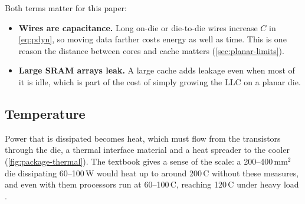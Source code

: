 Both terms matter for this paper:
\begin{itemize}
  \item \textbf{Wires are capacitance.} Long on-die or die-to-die wires increase $C$ in \cref{eq:pdyn}, so moving data farther costs energy as well as time. This is one reason the distance between cores and cache matters (\cref{sec:planar-limits}).
  \item \textbf{Large SRAM arrays leak.} A large cache adds leakage even when most of it is idle, which is part of the cost of simply growing the LLC on a planar die.
\end{itemize}

\subsection{Temperature}
Power that is dissipated becomes heat, which must flow from the transistors through the die, a thermal interface material and a heat spreader to the cooler \cite[sec.~10.10.1]{sarangi2025basic} (\cref{fig:package-thermal}). The textbook gives a sense of the scale: a 200--400\,mm$^2$ die dissipating 60--100\,W would heat up to around 200\,\textdegree C without these measures, and even with them processors run at 60--100\,\textdegree C, reaching 120\,\textdegree C under heavy load \cite[sec.~10.10.1]{sarangi2025basic}.

